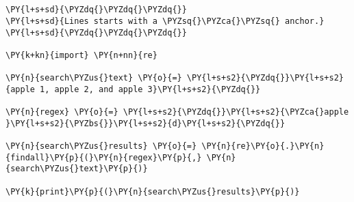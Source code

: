 

\section*{}

\begin{Verbatim}[commandchars=\\\{\}]
\PY{l+s+sd}{\PYZdq{}\PYZdq{}\PYZdq{}}
\PY{l+s+sd}{Lines starts with a \PYZsq{}\PYZca{}\PYZsq{} anchor.}
\PY{l+s+sd}{\PYZdq{}\PYZdq{}\PYZdq{}}

\PY{k+kn}{import} \PY{n+nn}{re}

\PY{n}{search\PYZus{}text} \PY{o}{=} \PY{l+s+s2}{\PYZdq{}}\PY{l+s+s2}{apple 1, apple 2, and apple 3}\PY{l+s+s2}{\PYZdq{}}

\PY{n}{regex} \PY{o}{=} \PY{l+s+s2}{\PYZdq{}}\PY{l+s+s2}{\PYZca{}apple }\PY{l+s+s2}{\PYZbs{}}\PY{l+s+s2}{d}\PY{l+s+s2}{\PYZdq{}}

\PY{n}{search\PYZus{}results} \PY{o}{=} \PY{n}{re}\PY{o}{.}\PY{n}{findall}\PY{p}{(}\PY{n}{regex}\PY{p}{,} \PY{n}{search\PYZus{}text}\PY{p}{)}

\PY{k}{print}\PY{p}{(}\PY{n}{search\PYZus{}results}\PY{p}{)}
\end{Verbatim}
